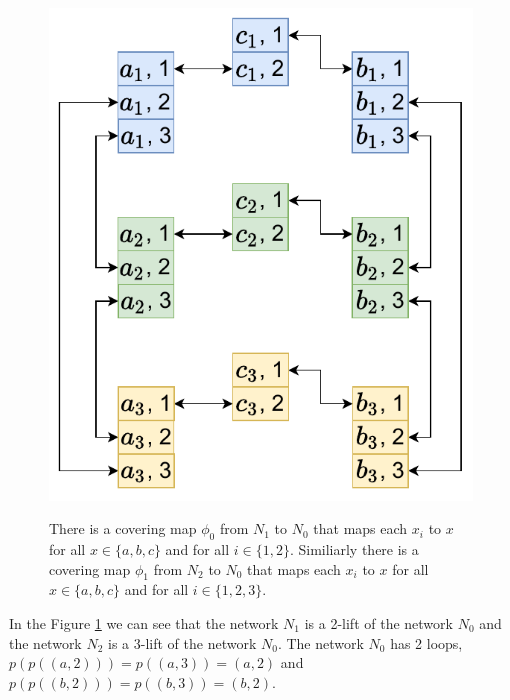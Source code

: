 \begin{figure}[H]
{    \includegraphics[scale=0.50]{diagrams/covering_map_5c.pdf}
  }
  \caption{
    There is a covering map $\phi_0$ from $N_1$ to $N_0$ that maps each $x_i$ to $x$ for all $x \in \{a, b, c\}$ and for all $i \in \{1, 2\}$.
    Similiarly there is a covering map $\phi_1$ from $N_2$ to $N_0$ that maps each $x_i$ to $x$ for all $x \in \{a, b, c\}$ and for all $i \in \{1, 2, 3\}$.
  }
  \label{fig:covering_map3}
\end{figure}

In the Figure \ref{fig:covering_map3} we can see that the network $N_1$ is a 2-lift of the network $N_0$ and the network $N_2$ is a 3-lift of the network $N_0$.
The network $N_0$ has 2 loops, $p(p((a, 2))) = p((a, 3)) = (a, 2)$ and $p(p((b, 2))) = p((b, 3)) = (b, 2)$.




